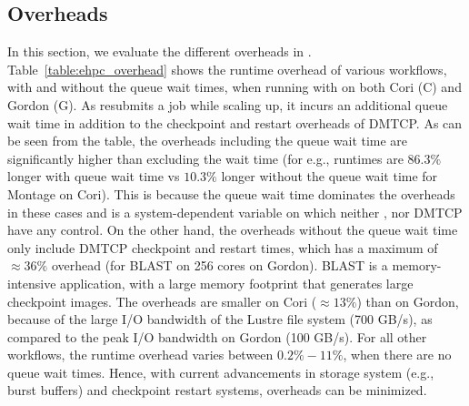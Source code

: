 \vspace{-0.3cm}
\subsection{\systemname Overheads}
\label{section:ehpc_overheads}

In this section, we evaluate the different overheads in \systemname.
Table~\ref{table:ehpc_overhead} shows the runtime overhead of various
workflows, with and without the queue wait times, when running with
\systemname on both Cori (C) and Gordon (G).  As \systemname resubmits
a job while scaling up, it incurs an additional queue wait time in
addition to the checkpoint and restart overheads of DMTCP. As can be
seen from the table, the overheads including the queue wait time are
significantly higher than excluding the wait time (for e.g., runtimes
are $86.3 \%$ longer with queue wait time vs $10.3\%$ longer without
the queue wait time for Montage on Cori). This is because the queue
wait time dominates the overheads in these cases and is a
system-dependent variable on which neither \systemname, nor DMTCP have
any control. On the other hand, the overheads without the queue wait
time only include DMTCP checkpoint and restart times, which has a
maximum of $\approx 36 \%$ overhead (for BLAST on 256 cores on
Gordon). BLAST is a memory-intensive application, with a large memory
footprint that generates large checkpoint images. The overheads are
smaller on Cori ($\approx 13 \%$) than on Gordon, because of the large
I/O bandwidth of the Lustre file system (700 GB/s), as compared to the
peak I/O bandwidth on Gordon (100 GB/s). %
For all other workflows, the runtime overhead varies between $0.2 \% - 11 \%$,
when there are no queue wait times. Hence, with current advancements
in storage system (e.g., burst buffers) and checkpoint restart
systems, \systemname overheads can be minimized.

